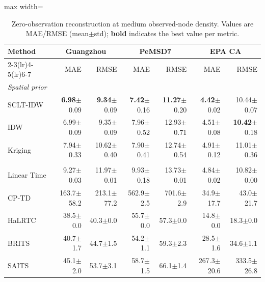 \begin{table}[htbp]
\centering
\caption{Zero-observation reconstruction at medium observed-node density. Values are MAE/RMSE (mean$\pm$std); \textbf{bold} indicates the best value per metric.}
\label{tab:zero_observation_medium}
\TableFont
\setlength{\tabcolsep}{4pt}
\begin{adjustbox}{max width=\textwidth}
\begin{tabular}{lrrrrrr}
\toprule
\rowcolor{TableHeader}
Method & \multicolumn{2}{c}{Guangzhou} & \multicolumn{2}{c}{PeMSD7} & \multicolumn{2}{c}{EPA CA} \\
\cmidrule(lr){2-3}\cmidrule(lr){4-5}\cmidrule(lr){6-7}
 & MAE & RMSE & MAE & RMSE & MAE & RMSE \\
\midrule
\multicolumn{7}{l}{\textit{Spatial prior}} \\
\addlinespace[2pt]
SCLT-IDW & \textbf{6.98}$\pm$0.09 & \textbf{9.34}$\pm$0.09 & \textbf{7.42}$\pm$0.16 & \textbf{11.27}$\pm$0.20 & \textbf{4.42}$\pm$0.02 & 10.44$\pm$0.07 \\
IDW & 6.99$\pm$0.09 & 9.35$\pm$0.09 & 7.96$\pm$0.52 & 12.93$\pm$0.71 & 4.51$\pm$0.08 & \textbf{10.42}$\pm$0.18 \\
Kriging & 7.94$\pm$0.33 & 10.62$\pm$0.40 & 7.90$\pm$0.41 & 12.74$\pm$0.54 & 4.91$\pm$0.12 & 11.01$\pm$0.36 \\
\addlinespace[4pt]
\multicolumn{7}{l}{\textit{No spatial prior}} \\
\addlinespace[2pt]
Linear Time & 9.27$\pm$0.03 & 11.97$\pm$0.01 & 9.93$\pm$0.18 & 13.73$\pm$0.01 & 4.84$\pm$0.02 & 10.82$\pm$0.00 \\
CP-TD & 163.7$\pm$58.2 & 213.1$\pm$77.2 & 562.9$\pm$2.5 & 701.6$\pm$2.9 & 34.9$\pm$17.7 & 43.0$\pm$21.7 \\
HaLRTC & 38.5$\pm$0.0 & 40.3$\pm$0.0 & 55.7$\pm$0.0 & 57.3$\pm$0.0 & 14.8$\pm$0.0 & 18.3$\pm$0.0 \\
BRITS & 40.7$\pm$1.7 & 44.7$\pm$1.5 & 54.2$\pm$1.1 & 59.3$\pm$2.3 & 28.5$\pm$1.6 & 34.6$\pm$1.1 \\
SAITS & 45.1$\pm$2.0 & 53.7$\pm$3.1 & 58.7$\pm$1.5 & 66.1$\pm$1.4 & 267.3$\pm$20.6 & 333.5$\pm$26.8 \\
\bottomrule
\end{tabular}
\end{adjustbox}
\end{table}
